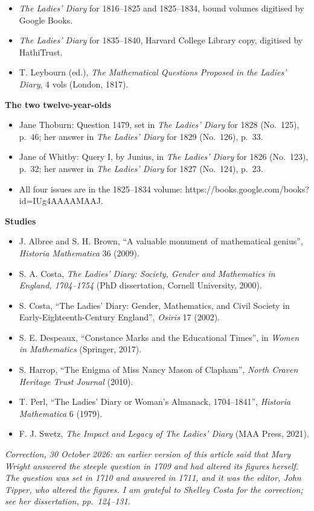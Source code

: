 \documentclass[11pt,a4paper]{article}
\providecommand{\tightlist}{\setlength{\itemsep}{0pt}\setlength{\parskip}{0pt}}
\begin{document}
\begin{itemize}
\tightlist
\item
  \emph{The Ladies' Diary} for 1816--1825 and 1825--1834, bound volumes
  digitised by Google Books.
\item
  \emph{The Ladies' Diary} for 1835--1840, Harvard College Library copy,
  digitised by HathiTrust.
\item
  T. Leybourn (ed.), \emph{The Mathematical Questions Proposed in the
  Ladies' Diary}, 4 vols (London, 1817).
\end{itemize}

\textbf{The two twelve-year-olds}

\begin{itemize}
\tightlist
\item
  Jane Thoburn: Question 1479, set in \emph{The Ladies' Diary} for 1828
  (No.~125), p.~46; her answer in \emph{The Ladies' Diary} for 1829
  (No.~126), p.~33.
\item
  Jane of Whitby: Query I, by Junius, in \emph{The Ladies' Diary} for
  1826 (No.~123), p.~32; her answer in \emph{The Ladies' Diary} for 1827
  (No.~124), p.~23.
\item
  All four issues are in the 1825--1834 volume:
  https://books.google.com/books?id=IUg4AAAAMAAJ.
\end{itemize}

\textbf{Studies}

\begin{itemize}
\tightlist
\item
  J. Albree and S. H. Brown, ``A valuable monument of mathematical
  genius'', \emph{Historia Mathematica} 36 (2009).
\item
  S. A. Costa, \emph{The Ladies' Diary: Society, Gender and Mathematics
  in England, 1704--1754} (PhD dissertation, Cornell University, 2000).
\item
  S. Costa, ``The Ladies' Diary: Gender, Mathematics, and Civil Society
  in Early-Eighteenth-Century England'', \emph{Osiris} 17 (2002).
\item
  S. E. Despeaux, ``Constance Marks and the Educational Times'', in
  \emph{Women in Mathematics} (Springer, 2017).
\item
  S. Harrop, ``The Enigma of Miss Nancy Mason of Clapham'', \emph{North
  Craven Heritage Trust Journal} (2010).
\item
  T. Perl, ``The Ladies' Diary or Woman's Almanack, 1704--1841'',
  \emph{Historia Mathematica} 6 (1979).
\item
  F. J. Swetz, \emph{The Impact and Legacy of The Ladies' Diary} (MAA
  Press, 2021).
\end{itemize}

\emph{Correction, 30 October 2026: an earlier version of this article
said that Mary Wright answered the steeple question in 1709 and had
altered its figures herself. The question was set in 1710 and answered
in 1711, and it was the editor, John Tipper, who altered the figures. I
am grateful to Shelley Costa for the correction; see her dissertation,
pp.~124--131.}
\end{document}
